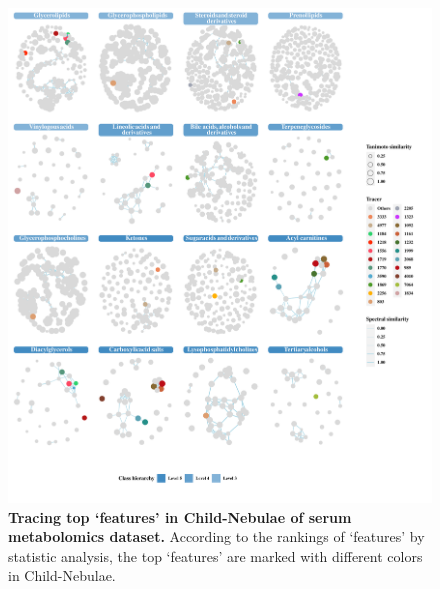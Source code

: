 \documentclass[
]{article}
\begin{document}
\begin{figure}
\hypertarget{fig:serum_tracer}{%
\centering
\includegraphics{fig4.serum_tracer.pdf}
\caption{\textbf{Tracing top `features' in Child-Nebulae of serum
metabolomics dataset.} According to the rankings of `features' by
statistic analysis, the top `features' are marked with different colors
in Child-Nebulae.}\label{fig:serum_tracer}
}
\end{figure}
\end{document}
